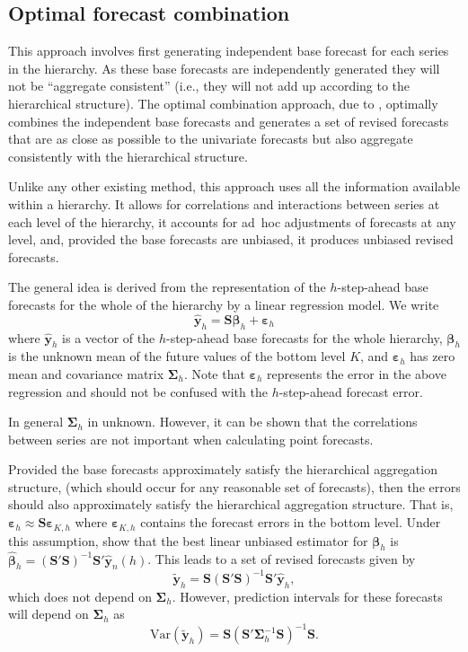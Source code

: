 \documentclass[nojss]{jss}
\begin{document}
\subsection*{Optimal forecast combination}


This approach involves first generating independent base forecast for each series in the hierarchy. As these base forecasts are independently generated they will not be ``aggregate consistent'' (i.e., they will not add up according to the hierarchical structure). The optimal combination approach, due to \citet{HAA+11}, optimally combines the independent base forecasts and generates a set of revised forecasts that are as close as possible to the univariate forecasts but also aggregate consistently with the hierarchical structure.

Unlike any other existing method, this approach uses all the information available within a hierarchy. It allows for correlations and interactions between series at each level of the hierarchy, it accounts for ad~hoc adjustments of forecasts at any level, and, provided the base forecasts are unbiased, it produces unbiased revised forecasts.

The general idea is derived from the representation of the $h$-step-ahead base forecasts for the whole of the hierarchy by a linear regression model. We write
\begin{equation} \label{eqn:regression}
\hat{\bm{y}}_h= \bm{S}\bm{\beta}_{h}+\bm{\varepsilon}_{h}
\end{equation}
where $\hat{\bm{y}}_h$ is a vector of the $h$-step-ahead base forecasts for the whole  hierarchy, $\bm{\beta}_{h}$ is the unknown mean of the future values of the bottom level $K$, and $\bm{\varepsilon}_{h}$ has zero mean and covariance matrix $\bm{\Sigma}_{h}$. Note that $\bm{\varepsilon}_{h}$ represents the error in the above regression and should not be confused with the $h$-step-ahead forecast error.


In general $\bm{\Sigma}_{h}$ in unknown. However, it can be shown that the correlations between series are not important when calculating point forecasts.

Provided the base forecasts approximately satisfy the hierarchical aggregation structure, (which should occur for any reasonable set of forecasts), then the errors should also approximately satisfy the hierarchical aggregation structure. That is, $\bm{\varepsilon}_{h}\approx\bm{S}\bm{\varepsilon}_{K,h}$ where $\bm{\varepsilon}_{K,h}$ contains the forecast errors in the bottom level. Under this assumption, \citet{HAA+11} show that the best linear unbiased estimator for $\bm{\beta}_{h}$ is  $\hat{\bm{\beta}}_{h}=(\bm{S}'\bm{S})^{-1}\bm{S}'\hat{\bm{y}}_n(h)$. This leads to a set of revised forecasts given by
\begin{equation}\label{eq-9-optcombination}
         \tilde{\bm{y}}_{h}=\bm{S}(\bm{S}'\bm{S})^{-1}\bm{S}'\hat{\bm{y}}_h,
\end{equation}
which does not depend on $\bm{\Sigma}_h$. However, prediction intervals for these forecasts will depend on $\bm{\Sigma}_h$ as
\[
\text{Var}(\tilde{\bm{y}}_h) = \bm{S}(\bm{S}'\bm{\Sigma}_h^{-1}\bm{S})^{-1}\bm{S}.
\]
   
\end{document}
